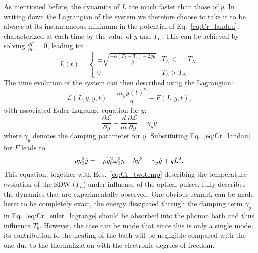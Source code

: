 As mentioned before, the dynamics of $L$ are much faster than those of $y$.
In writing down the Lagrangian of the system we therefore choose to take it to be always at its instantaneous minimum in the potential of Eq.~\eqref{eq:Cr_landau}, characterized at each time by the value of $y$ and $T_L$.
This can be achieved by solving $\frac{\partial F}{\partial L} = 0$, leading to:
\begin{equation}
	\label{eq:Cr_L0}
	L(t) =
	\begin{cases}
		\pm \sqrt{\frac{- \alpha (T_L - T_c) + 2 g y}{\beta}} & T_L <= T_N\\
		0 & T_L > T_N
	\end{cases}
\end{equation}
The time evolution of the system can then described using the Lagrangian:
\begin{equation}
    \mathcal{L}(L, y, \dot{y}, t) = \frac{m_y \dot{y}(t)^2}{2} - F(L, y, t),
\end{equation}
with associated Euler-Lagrange equation for $y$:
\begin{equation}
    \frac{\partial \mathcal{L}}{\partial y} - \frac{d}{dt}\frac{\partial \mathcal{L}}{\partial \dot{y}} = \gamma_y \dot{y}
\end{equation}
where $\gamma_y$ denotes the damping parameter for $y$.
Substituting Eq.~\eqref{eq:Cr_landau} for $F$ leads to 
\begin{equation}
	\label{eq:Cr_euler_lagrange}
	    \rho y_0^2 \Ddot{y} = -\rho y_0^2 \omega_0^2 y  - b y^3 - \gamma_y \dot{y} + gL^2.
\end{equation}
This equation, together with Eqs.~\ref{eq:Cr_twotemp} describing the temperature evolution of the SDW ($T_L$) under influence of the optical pulses, fully describes the dynamics that are experimentally observed.
One obvious remark can be made here: to be completely exact, the energy dissipated through the damping term $\gamma_y$ in Eq.~\eqref{eq:Cr_euler_lagrange} should be absorbed into the phonon bath and thus influence $T_b$.
However, the case can be made that since this is only a single mode, its contribution to the heating of the bath will be negligible compared with the one due to the thermalization with the electronic degrees of freedom.

